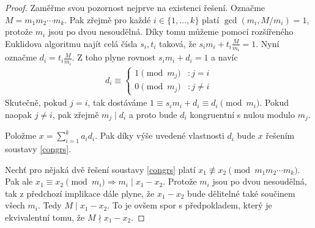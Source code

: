 \begin{proof}
Zaměřme svou pozornost nejprve na existenci řešení. Označme
$ M = m_1 m_2 \cdots m_k $. Pak zřejmě pro každé $ i \in \{1,\dots,k\} $
platí $ \gcd(m_i, M / m_i) = 1 $, protože $ m_i $ jsou po dvou nesoudělná.
Díky tomu můžeme pomocí rozšířeného Euklidova algoritmu najít celá čísla
$ s_i, t_i $ taková, že $ s_i m_i + t_i \frac{M}{m_i} = 1 $. Nyní označme
$ d_i = t_i \frac{M}{m_i} $. Z toho plyne rovnost $ s_i m_i + d_i = 1 $ a navíc
\begin{align*}
d_i \equiv
\left\{
  \begin{array}{lr}
    1 \pmod{ m_j } & : j = i \\
    0 \pmod{ m_j }  & : j \neq i
  \end{array}
\right.
\end{align*}
Skutečně, pokud $ j = i $, tak dostáváme
$ 1 \equiv s_i m_i + d_i \equiv d_i \pmod{m_i} $. Pokud naopak $ j \neq i $, pak
zřejmě $ m_j \mid d_i $ a proto bude $ d_i $ kongruentní s nulou modulo $ m_j $.

Položme $ x = \sum\limits_{i = 1}^{k} a_i d_i $. Pak díky výše uvedené
vlastnosti $ d_i $ bude $ x $ řešením soustavy \eqref{congrs}.

Nechť pro nějaká dvě řešení soustavy \eqref{congrs} platí
$ x_1 \not\equiv x_2 \pmod{m_1 m_2 \cdots m_k} $. Pak ale
$ x_1 \equiv x_2 \pmod{m_i} \Rightarrow m_i \mid x_1 - x_2 $. Protože $ m_i $
jsou po dvou nesoudělná, tak z předchozí implikace dále plyne, že
$ x_1 - x_2 $ bude dělitelné také součinem všech $ m_i $. Tedy
$ M \mid x_1 - x_2 $. To je ovšem spor s předpokladem, který je ekvivalentní
tomu, že $ M \nmid x_1 - x_2 $.
\end{proof}